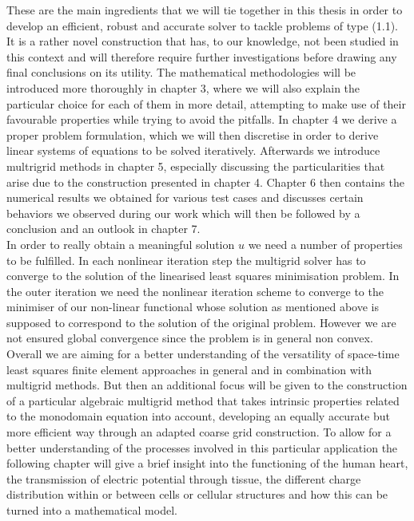 \documentclass[../draft_1.tex]{subfiles}
\begin{document}
These are the main ingredients that we will tie together in this thesis in order to develop an efficient, robust and accurate solver to tackle problems of type (1.1). It is a rather novel construction that has, to our knowledge, not been studied in this context and will therefore require further investigations before drawing any final conclusions on its utility. The mathematical methodologies will be introduced more thoroughly in chapter 3, where we will also explain the particular choice for each of them in more detail, attempting to make use of their favourable properties while trying to avoid the pitfalls. In chapter 4 we derive a proper problem formulation, which we will then discretise in order to derive linear systems of equations to be solved iteratively. Afterwards we introduce multrigrid methods in chapter 5, especially discussing the particularities that arise due to the construction presented in chapter 4. Chapter 6 then contains the numerical results we obtained for various test cases and discusses certain behaviors we observed during our work which will then be followed by a conclusion and an outlook in chapter 7. 
\bigskip
\\ 
In order to really obtain a meaningful solution $u$ we need a number of properties to be fulfilled. In each nonlinear iteration step the multigrid solver has to converge to the solution of the linearised least squares minimisation problem. In the outer iteration we need the nonlinear iteration scheme to converge to the minimiser of our non-linear functional whose solution as mentioned above is supposed to correspond to the solution of the original problem. However we are not ensured global convergence since the problem is in general non convex. 
\bigskip
\\
Overall we are aiming for a better understanding of the versatility of space-time least squares finite element approaches in general and in combination with multigrid methods. But then an additional focus will be given to the construction of a particular algebraic multigrid method that takes intrinsic properties related to the monodomain equation into account, developing an equally accurate but more efficient way through an adapted coarse grid construction. To allow for a better understanding of the processes involved in this particular application the following chapter will give a brief insight into the functioning of the human heart, the transmission of electric potential through tissue, the different charge distribution within or between cells or cellular structures and how this can be turned into a mathematical model. 
\end{document}
